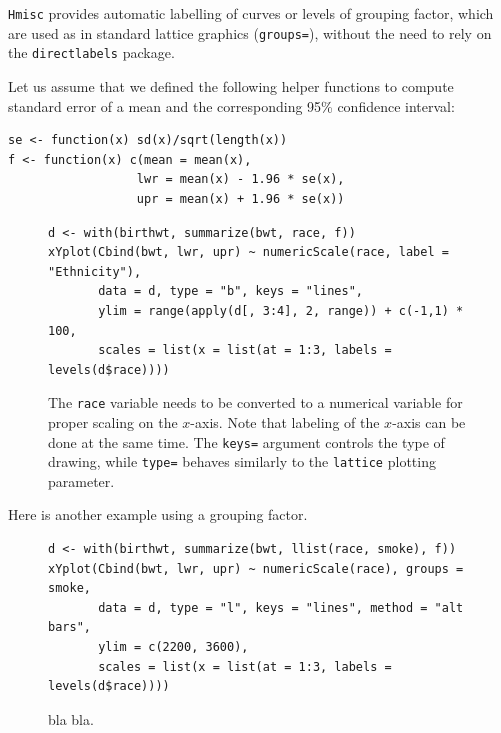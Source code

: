 \documentclass[a4paper,twoside]{book}
\newcounter{fig}
\newcommand{\img}[1]{\texttt{[image: \#1]}\stepcounter{fig}}
\renewcommand{\texttt}[1]{\lstinline{#1}}
\begin{document}
\texttt{Hmisc} provides automatic labelling of curves or levels of grouping
factor, which are used as in standard lattice graphics (\texttt{groups=}),
without the need to rely on the \texttt{directlabels} package. 

Let us assume that we defined the following helper functions to compute
standard error of a mean and the corresponding 95\% confidence interval:
\begin{verbatim}
se <- function(x) sd(x)/sqrt(length(x))
f <- function(x) c(mean = mean(x), 
                  lwr = mean(x) - 1.96 * se(x), 
                  upr = mean(x) + 1.96 * se(x))
\end{verbatim}


\begin{figure}[H]
\begin{lstlisting}
d <- with(birthwt, summarize(bwt, race, f))
xYplot(Cbind(bwt, lwr, upr) ~ numericScale(race, label = "Ethnicity"), 
       data = d, type = "b", keys = "lines", 
       ylim = range(apply(d[, 3:4], 2, range)) + c(-1,1) * 100, 
       scales = list(x = list(at = 1:3, labels = levels(d$race))))
\end{lstlisting}
  \fcapside[\FBwidth] {\img{figs_lattice-crop}}
  {\caption*{The \texttt{race} variable needs to be converted to a numerical
      variable for proper scaling on the $x$-axis. Note that labeling of the
      $x$-axis can be done at the same time. The \texttt{keys=} argument
      controls the type of drawing, while \texttt{type=} behaves similarly
      to the \texttt{lattice} plotting parameter.}} 
\end{figure}


Here is another example using a grouping factor.

\begin{figure}[H]
\begin{lstlisting}
d <- with(birthwt, summarize(bwt, llist(race, smoke), f))
xYplot(Cbind(bwt, lwr, upr) ~ numericScale(race), groups = smoke, 
       data = d, type = "l", keys = "lines", method = "alt bars", 
       ylim = c(2200, 3600), 
       scales = list(x = list(at = 1:3, labels = levels(d$race))))
\end{lstlisting}
  \fcapside[\FBwidth] {\img{figs_lattice-crop}}
  {\caption*{bla bla.}} 
\end{figure}

\begin{verbatim}
\end{verbatim}
\end{document}
